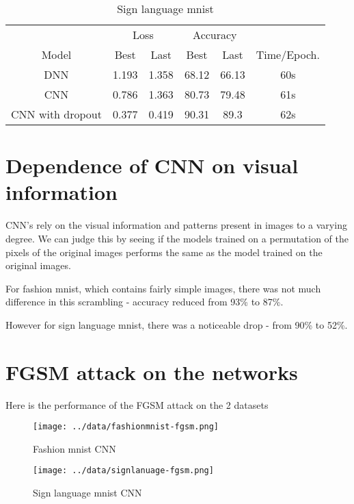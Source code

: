 \documentclass[12pt]{scrartcl}
\begin{document}
    \begin{table}[H]
        \centering
        \begin{tabular}{c|c|c|c|c|c}
            ~ & \multicolumn{2}{c|}{Loss} & \multicolumn{2}{c|}{Accuracy} &  \\ 
            Model & Best & Last & Best & Last & Time/Epoch. \\ \hline\hline
            DNN & 1.193 & 1.358 & 68.12 & 66.13 & 60s \\
            CNN & 0.786 & 1.363 & 80.73 & 79.48 & 61s \\
            CNN with dropout & 0.377 & 0.419 & 90.31 & 89.3 & 62s \\
        \end{tabular}
        \caption{Sign language mnist}
    \end{table}

\section{Dependence of CNN on visual information}

CNN's rely on the visual information and patterns present in images to a varying degree. We can judge this by seeing if the models trained on a permutation of the pixels of the original images performs the same as the model trained on the original images.

For fashion mnist, which contains fairly simple images, there was not much difference in this scrambling - accuracy reduced from 93\% to 87\%.

However for sign language mnist, there was a noticeable drop - from 90\% to 52\%.

\section{FGSM attack on the networks}

Here is the performance of the FGSM attack on the 2 datasets

\centering
\begin{figure}[H]
    \texttt{[image: ../data/fashionmnist-fgsm.png]}
    \caption{Fashion mnist CNN}
\end{figure}

\begin{figure}[H]
    \texttt{[image: ../data/signlanuage-fgsm.png]}
    \caption{Sign language mnist CNN}
\end{figure}
\end{document}
